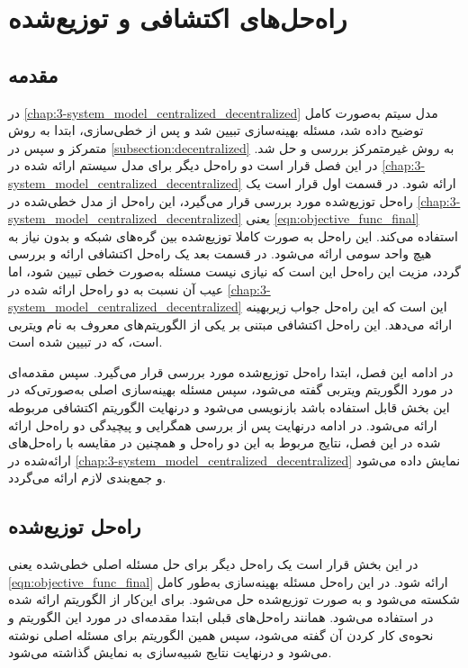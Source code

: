 \chapter{راه‌حل‌های اکتشافی و توزیع‌شده}\label{chap:4-heuristic_distributed}
\thispagestyle{empty}
\section{مقدمه}\label{subsection:inroduction_4}
	در \cref{chap:3-system_model_centralized_decentralized} مدل سیتم به‌صورت کامل توضیح داده شد، مسئله بهینه‌سازی تبیین شد و پس از خطی‌سازی، ابتدا به روش متمرکز و سپس در \cref{subsection:decentralized} به روش غیرمتمرکز بررسی و حل شد. 
	در این فصل قرار است دو راه‌حل دیگر برای مدل سیستم ارائه شده در \cref{chap:3-system_model_centralized_decentralized} ارائه شود. 
	 در قسمت اول قرار است یک راه‌حل توزیع‌شده مورد بررسی قرار می‌گیرد، این راه‌حل از مدل خطی‌شده در \cref{chap:3-system_model_centralized_decentralized} یعنی \cref{eqn:objective_func_final} استفاده می‌کند. این راه‌حل به صورت کاملا توزیع‌شده بین گره‌های شبکه و بدون نیاز به هیچ واحد سومی ارائه می‌شود.  
	 در قسمت بعد یک راه‌حل اکتشافی ارائه و بررسی گردد، مزیت این راه‌حل این است که نیازی نیست مسئله به‌صورت خطی تبیین شود، اما عیب آن نسبت به دو راه‌حل ارائه شده در \cref{chap:3-system_model_centralized_decentralized} این است که این راه‌حل جواب زیربهینه ارائه می‌دهد. 
	 این راه‌حل اکتشافی مبتنی بر یکی از الگوریتم‌های معروف به نام ویتربی است، که در \cite{viterbi} تبیین شده است. 
	 
	 در ادامه این فصل، ابتدا راه‌حل توزیع‌شده مورد بررسی قرار می‌گیرد. 
	 سپس مقدمه‌ای در مورد الگوریتم ویتربی گفته می‌شود، سپس مسئله‌ بهینه‌سازی اصلی به‌صورتی‌که در این بخش قابل استفاده باشد بازنویسی می‌شود و درنهایت الگوریتم اکتشافی مربوطه ارائه می‌شود. در ادامه 
	درنهایت پس از بررسی همگرایی و پیچیدگی دو راه‌حل ارائه شده در این فصل، نتایج مربوط به این دو راه‌حل و همچنین در مقایسه با راه‌حل‌های ارائه‌شده در \cref{chap:3-system_model_centralized_decentralized} نمایش داده می‌شود و جمع‌بندی لازم ارائه می‌گردد. 
\section{راه‌حل توزیع‌شده}\label{subsection:distributed}

در این بخش قرار است یک راه‌حل دیگر برای حل مسئله اصلی خطی‌شده یعنی \cref{eqn:objective_func_final} ارائه شود. در این راه‌حل مسئله بهینه‌سازی به‌طور کامل شکسته می‌شود و به صورت توزیع‌شده حل می‌شود. برای این‌کار از الگوریتم ارائه شده در \cite{testa2019distributed} استفاده می‌شود. همانند راه‌حل‌های قبلی ابتدا مقدمه‌ای  در مورد این الگوریتم و نحوه‌ی کار کردن آن گفته می‌شود، سپس همین الگوریتم برای مسئله اصلی نوشته می‌شود و درنهایت نتایج شبیه‌سازی به نمایش گذاشته می‌شود. 
